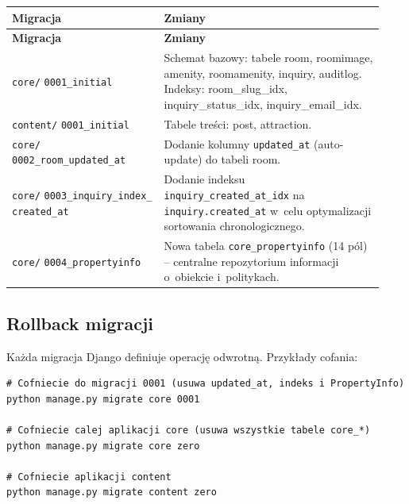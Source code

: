 \documentclass[12pt,a4paper]{article}
\begin{document}
\begin{longtable}{p{0.38\linewidth}p{0.55\linewidth}}
\toprule
\textbf{Migracja} & \textbf{Zmiany} \\
\midrule
\endfirsthead
\toprule
\textbf{Migracja} & \textbf{Zmiany} \\
\midrule
\endhead
\texttt{core/} \newline \texttt{0001\_initial} &
  Schemat bazowy: tabele room, roomimage, amenity, roomamenity, inquiry, auditlog.
  Indeksy: room\_slug\_idx, inquiry\_status\_idx, inquiry\_email\_idx. \\[4pt]
\texttt{content/} \newline \texttt{0001\_initial} &
  Tabele treści: post, attraction. \\[4pt]
\texttt{core/} \newline \texttt{0002\_room\_updated\_at} &
  Dodanie kolumny \texttt{updated\_at} (auto-update) do tabeli room. \\[4pt]
\texttt{core/} \newline \texttt{0003\_inquiry\_index\_} \newline \texttt{created\_at} &
  Dodanie indeksu \texttt{inquiry\_created\_at\_idx} na \texttt{inquiry.created\_at}
  w~celu optymalizacji sortowania chronologicznego. \\[4pt]
\texttt{core/} \newline \texttt{0004\_propertyinfo} &
  Nowa tabela \texttt{core\_propertyinfo} (14 pól) -- centralne repozytorium
  informacji o~obiekcie i~politykach. \\
\bottomrule
\end{longtable}

\subsection{Rollback migracji}

Każda migracja Django definiuje operację odwrotną. Przykłady cofania:

\begin{lstlisting}[style=consolestyle, caption={Cofanie migracji}]
# Cofniecie do migracji 0001 (usuwa updated_at, indeks i PropertyInfo)
python manage.py migrate core 0001

# Cofniecie calej aplikacji core (usuwa wszystkie tabele core_*)
python manage.py migrate core zero

# Cofniecie aplikacji content
python manage.py migrate content zero
\end{lstlisting}
\end{document}
